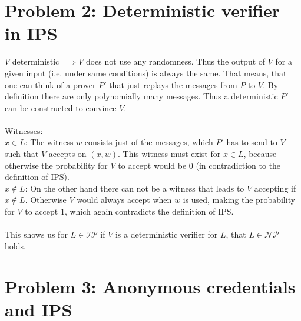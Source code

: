 \documentclass[12pt,pdftex,a4paper]{article}
\begin{document}
\section*{Problem 2: Deterministic verifier in IPS}
$V$ deterministic $\implies V$ does not use any randomness. Thus the output of $V$ for a given input (i.e. under same conditions) is always the same. That means, that one can think of a prover $P'$ that just replays the messages from $P$ to $V$. By definition there are only polynomially many messages. Thus a deterministic $P'$ can be constructed to convince $V$.\\~\\
Witnesses:\\
$x\in L$: The witness $w$ consists just of the messages, which $P'$ has to send to $V$ such that $V$ accepts on $(x, w)$. This witness must exist for $x\in L$, because otherwise the probability for $V$ to accept would be 0 (in contradiction to the definition of IPS).\\
$x\notin L$: On the other hand there can not be a witness that leads to $V$ accepting if $x\notin L$. Otherwise $V$ would always accept when $w$ is used, making the probability for $V$ to accept 1, which again contradicts the definition of IPS.
\\~\\
This shows us for $L\in \mathcal{IP}$ if $V$ is a deterministic verifier for $L$, that $L\in \mathcal{NP}$ holds.


\section*{Problem 3: Anonymous credentials and IPS}
\end{document}
